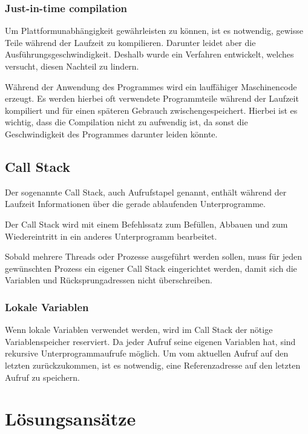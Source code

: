 \subsubsection{Just-in-time compilation}
Um Plattformunabhängigkeit gewährleisten zu können, ist es notwendig, gewisse Teile während der Laufzeit zu kompilieren. 
Darunter leidet aber die Ausführungsgeschwindigkeit. Deshalb wurde ein Verfahren entwickelt, welches versucht,
diesen Nachteil zu lindern.

Während der Anwendung des Programmes wird ein lauffähiger Maschinencode erzeugt. Es werden hierbei oft verwendete Programmteile
während der Laufzeit kompiliert und für einen späteren Gebrauch zwischengespeichert. Hierbei ist es wichtig, dass die Compilation nicht
zu aufwendig ist, da sonst die Geschwindigkeit des Programmes darunter leiden könnte.

\subsection{Call Stack}
Der sogenannte Call Stack, auch Aufrufstapel genannt, enthält während der Laufzeit Informationen über die gerade ablaufenden 
Unterprogramme. 

Der Call Stack wird mit einem Befehlssatz zum Befüllen, Abbauen und zum Wiedereintritt in ein anderes Unterprogramm bearbeitet.

Sobald mehrere Threads oder Prozesse ausgeführt werden sollen, muss für jeden gewünschten Prozess ein eigener Call Stack eingerichtet
werden, damit sich die Variablen und Rücksprungadressen nicht überschreiben.

\subsubsection{Lokale Variablen}
Wenn lokale Variablen verwendet werden, wird im Call Stack der nötige Variablenspeicher reserviert. Da jeder Aufruf seine
eigenen Variablen hat, sind rekursive Unterprogrammaufrufe möglich. Um vom aktuellen Aufruf auf den letzten zurückzukommen, ist
es notwendig, eine Referenzadresse auf den letzten Aufruf zu speichern.


\section{Lösungsansätze}
